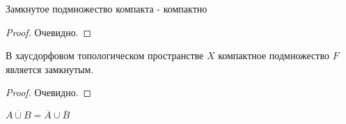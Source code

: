 \begin{statement}
    Замкнутое подмножество компакта - компактно
\end{statement}
\begin{proof}
    Очевидно.
\end{proof}

\begin{lemma}
    В хаусдорфовом топологическом пространстве $X$ компактное подмножество $F$ является замкнутым.
\end{lemma}
\begin{proof}
    Очевидно.
\end{proof}

\begin{exercise}
    $\overline{A \cup B} = \overline{A} \cup \overline{B}$
\end{exercise}
